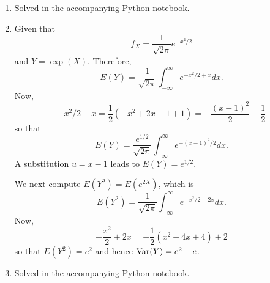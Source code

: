 \documentclass{article}
\begin{document}
\begin{enumerate}
\item Solved in the accompanying Python notebook.

\item Given that 
\[
f_X = \frac{1}{\sqrt{2\pi}}e^{-x^2/2}
\]
and $Y = \exp(X)$. Therefore,
\[
E(Y) = \frac{1}{\sqrt{2\pi}}\int_{-\infty}^\infty e^{-x^2/2 + x} dx.
\]
Now,
\[
-x^2/2 + x = \frac{1}{2}(-x^2 + 2x - 1 + 1) = -\frac{(x-1)^2}{2} + \frac{1}{2}
\]
so that
\[
E(Y) = \frac{e^{1/2}}{\sqrt{2\pi}}\int_{-\infty}^\infty e^{-(x - 1)^2/2}dx.
\]
A substitution $u = x - 1$ leads to $E(Y) = e^{1/2}$.

We next compute $E(Y^2) = E(e^{2X})$, which is
\[
E(Y^2) = \frac{1}{\sqrt{2\pi}}\int_{-\infty}^\infty e^{-x^2/2 + 2x} dx.
\]
Now,
\[
-\frac{x^2}{2} + 2x = -\frac{1}{2}(x^2 - 4x + 4) + 2
\] 
so that $E(Y^2) = e^2$ and hence $\operatorname{Var}(Y) = e^2 - e$.

\item Solved in the accompanying Python notebook.
\end{enumerate}
 
\end{document}

